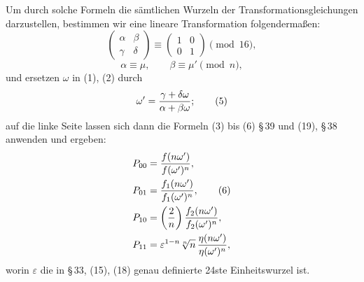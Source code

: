 \documentclass[11pt]{article}
\begin{document}
Um durch solche Formeln die sämtlichen Wurzeln der Transformationsgleichungen
darzustellen, bestimmen wir eine lineare Transformation folgendermaßen:
\begin{equation}
 \begin{pmatrix}\alpha&\beta\\ \gamma&\delta\end{pmatrix}
 \equiv
 \begin{pmatrix}1&0\\0&1\end{pmatrix}\pmod{16},
\tag{3}
\end{equation}
\begin{equation}
 \alpha\equiv\mu,
 \qquad \beta\equiv\mu'\pmod n,
\tag{4}
\end{equation}
und ersetzen $\omega$ in (1), (2) durch
\begin{equation}
 \omega'={\gamma+\delta\omega\over \alpha+\beta\omega};
\tag{5}
\end{equation}
auf die linke Seite lassen sich dann die Formeln (3) bis (6) \S\,39 und (19), \S\,38
anwenden und ergeben:
\begin{align}
 P_{00}&={f(n\omega')\over f(\omega')^n},\notag\\
 P_{01}&={f_1(n\omega')\over f_1(\omega')^n},
\tag{6}\\
 P_{10}&=\left({2\over n}\right){f_2(n\omega')\over f_2(\omega')^n},\notag\\
 P_{11}&=\varepsilon^{1-n}\sqrt[n]{n}\,{\eta(n\omega')\over\eta(\omega')^n},\notag
\end{align}
worin $\varepsilon$ die in \S\,33, (15), (18) genau definierte 24ste Einheitswurzel ist.
\end{document}
